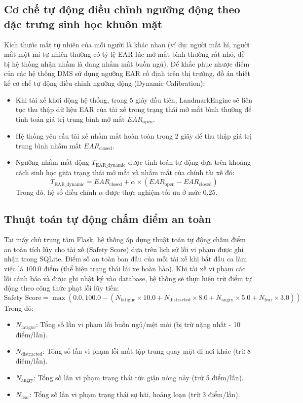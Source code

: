 \documentclass[../DoAn.tex]{subfiles}
\begin{document}
\subsection{Cơ chế tự động điều chỉnh ngưỡng động theo đặc trưng sinh học khuôn mặt}
Kích thước mắt tự nhiên của mỗi người là khác nhau (ví dụ: người mắt hí, người mắt một mí tự nhiên thường có tỷ lệ EAR lúc mở mắt bình thường rất nhỏ, dễ bị hệ thống nhận nhầm là đang nhắm mắt buồn ngủ). Để khắc phục nhược điểm của các hệ thống DMS sử dụng ngưỡng EAR cố định trên thị trường, đồ án thiết kế cơ chế tự động điều chỉnh ngưỡng động (Dynamic Calibration):
\begin{itemize}
    \item Khi tài xế khởi động hệ thống, trong 5 giây đầu tiên, LandmarkEngine sẽ liên tục thu thập dữ liệu EAR của tài xế trong trạng thái mở mắt bình thường để tính toán giá trị trung bình mở mắt $EAR_{\text{open}}$.
    \item Hệ thống yêu cầu tài xế nhắm mắt hoàn toàn trong 2 giây để thu thập giá trị trung bình nhắm mắt $EAR_{\text{closed}}$.
    \item Ngưỡng nhắm mắt động $T_{\text{EAR\_dynamic}}$ được tính toán tự động dựa trên khoảng cách sinh học giữa trạng thái mở mắt và nhắm mắt của chính tài xế đó:
    \[ T_{\text{EAR\_dynamic}} = EAR_{\text{closed}} + \alpha \times (EAR_{\text{open}} - EAR_{\text{closed}}) \]
    Trong đó, hệ số điều chỉnh $\alpha$ được thực nghiệm tối ưu ở mức $0.25$.
\end{itemize}

\subsection{Thuật toán tự động chấm điểm an toàn}
Tại máy chủ trung tâm Flask, hệ thống áp dụng thuật toán tự động chấm điểm an toàn tích lũy cho tài xế (Safety Score) dựa trên lịch sử lỗi vi phạm được ghi nhận trong SQLite.
Điểm số an toàn ban đầu của mỗi tài xế khi bắt đầu ca làm việc là $100.0$ điểm (thể hiện trạng thái lái xe hoàn hảo). Khi tài xế vi phạm các lỗi cảnh báo và được ghi nhật ký vào database, hệ thống sẽ thực hiện trừ điểm tự động theo công thức phạt lỗi lũy tiến:
\[ \text{Safety Score} = \max\left(0.0, 100.0 - \left(N_{\text{fatigue}} \times 10.0 + N_{\text{distracted}} \times 8.0 + N_{\text{angry}} \times 5.0 + N_{\text{fear}} \times 3.0\right)\right) \]
Trong đó:
\begin{itemize}
    \item $N_{\text{fatigue}}$: Tổng số lần vi phạm lỗi buồn ngủ/mệt mỏi (bị trừ nặng nhất - 10 điểm/lần).
    \item $N_{\text{distracted}}$: Tổng số lần vi phạm lỗi mất tập trung quay mặt đi nơi khác (trừ 8 điểm/lần).
    \item $N_{\text{angry}}$: Tổng số lần vi phạm trạng thái tức giận nóng nảy (trừ 5 điểm/lần).
    \item $N_{\text{fear}}$: Tổng số lần vi phạm trạng thái sợ hãi, hoảng loạn (trừ 3 điểm/lần).
\end{itemize}
\end{document}
